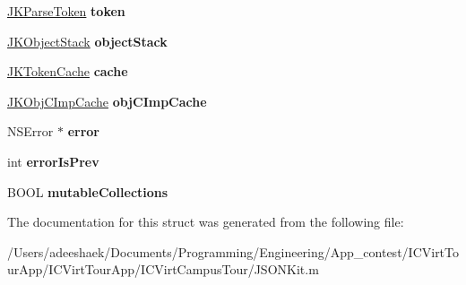\begin{DoxyCompactItemize}
\item 
\hypertarget{struct_j_k_parse_state_ac1642944b7c6c1e07e95a68dad071345}{\hyperlink{struct_j_k_parse_token}{J\-K\-Parse\-Token} {\bfseries token}}\label{struct_j_k_parse_state_ac1642944b7c6c1e07e95a68dad071345}

\item 
\hypertarget{struct_j_k_parse_state_a23a34a9fce209040cce4d004ad6d2aea}{\hyperlink{struct_j_k_object_stack}{J\-K\-Object\-Stack} {\bfseries object\-Stack}}\label{struct_j_k_parse_state_a23a34a9fce209040cce4d004ad6d2aea}

\item 
\hypertarget{struct_j_k_parse_state_a043da987fc562517a727e29f7803ab50}{\hyperlink{struct_j_k_token_cache}{J\-K\-Token\-Cache} {\bfseries cache}}\label{struct_j_k_parse_state_a043da987fc562517a727e29f7803ab50}

\item 
\hypertarget{struct_j_k_parse_state_a1c0d625768df054b19d6572d5e54ccad}{\hyperlink{struct_j_k_obj_c_imp_cache}{J\-K\-Obj\-C\-Imp\-Cache} {\bfseries obj\-C\-Imp\-Cache}}\label{struct_j_k_parse_state_a1c0d625768df054b19d6572d5e54ccad}

\item 
\hypertarget{struct_j_k_parse_state_aa4a96b60b18f49477d1c840bb272eceb}{N\-S\-Error $\ast$ {\bfseries error}}\label{struct_j_k_parse_state_aa4a96b60b18f49477d1c840bb272eceb}

\item 
\hypertarget{struct_j_k_parse_state_a365d0ac9fe8896ab68cac2d3626bb059}{int {\bfseries error\-Is\-Prev}}\label{struct_j_k_parse_state_a365d0ac9fe8896ab68cac2d3626bb059}

\item 
\hypertarget{struct_j_k_parse_state_a89c572486db12758f25b709f054565f0}{B\-O\-O\-L {\bfseries mutable\-Collections}}\label{struct_j_k_parse_state_a89c572486db12758f25b709f054565f0}

\end{DoxyCompactItemize}


The documentation for this struct was generated from the following file\-:\begin{DoxyCompactItemize}
\item 
/\-Users/adeeshaek/\-Documents/\-Programming/\-Engineering/\-App\-\_\-contest/\-I\-C\-Virt\-Tour\-App/\-I\-C\-Virt\-Tour\-App/\-I\-C\-Virt\-Campus\-Tour/J\-S\-O\-N\-Kit.\-m\end{DoxyCompactItemize}
